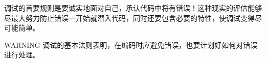 调试的首要规则是要诚实地面对自己，承认代码中将有错误！这种现实的评估能够尽最大努力防止错误一开始就潜入代码，同时还要包含必要的特性，使调试变得尽可能简单。

\begin{myWarning}{WARNING}
调试的基本法则表明，在编码时应避免错误，也要计划好如何对错误进行处理。
\end{myWarning}













